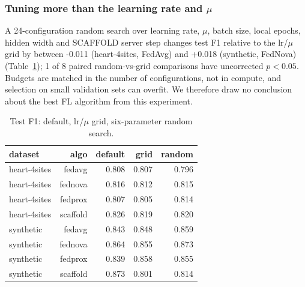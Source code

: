 \documentclass[conference]{IEEEtran}
\begin{document}
\subsubsection{Tuning more than the learning rate and $\mu$}
A 24-configuration random search over learning rate, $\mu$, batch size, local epochs, hidden width and SCAFFOLD server step changes test F1 relative to the lr/$\mu$ grid by between -0.011 (heart-4sites, FedAvg) and +0.018 (synthetic, FedNova) (Table~\ref{t:rs}); 1 of 8 paired random-vs-grid comparisons have uncorrected $p<0.05$. Budgets are matched in the number of configurations, not in compute, and selection on small validation sets can overfit. We therefore draw no conclusion about the best FL algorithm from this experiment.
\begin{table}[t]\centering\caption{Test F1: default, lr/$\mu$ grid, six-parameter random search.}\label{t:rs}\scriptsize
\begin{tabular}{lrrrr}\toprule
dataset & algo & default & grid & random \\\midrule
heart-4sites & fedavg & 0.808 & 0.807 & 0.796 \\
heart-4sites & fednova & 0.816 & 0.812 & 0.815 \\
heart-4sites & fedprox & 0.807 & 0.805 & 0.814 \\
heart-4sites & scaffold & 0.826 & 0.819 & 0.820 \\
synthetic & fedavg & 0.843 & 0.848 & 0.859 \\
synthetic & fednova & 0.864 & 0.855 & 0.873 \\
synthetic & fedprox & 0.839 & 0.858 & 0.855 \\
synthetic & scaffold & 0.873 & 0.801 & 0.814 \\\bottomrule\end{tabular}\end{table}
\end{document}
